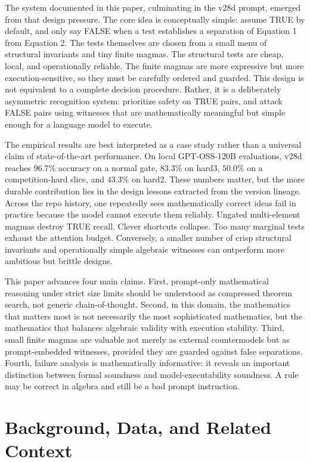 \documentclass[12pt]{amsart}
\begin{document}
The system documented in this paper, culminating in the v28d prompt, emerged from that design pressure. The core idea is conceptually simple: assume TRUE by default, and only say FALSE when a test establishes a separation of Equation 1 from Equation 2. The tests themselves are chosen from a small menu of structural invariants and tiny finite magmas. The structural tests are cheap, local, and operationally reliable. The finite magmas are more expressive but more execution-sensitive, so they must be carefully ordered and guarded. This design is not equivalent to a complete decision procedure. Rather, it is a deliberately asymmetric recognition system: prioritize safety on TRUE pairs, and attack FALSE pairs using witnesses that are mathematically meaningful but simple enough for a language model to execute.

The empirical results are best interpreted as a case study rather than a universal claim of state-of-the-art performance. On local GPT-OSS-120B evaluations, v28d reaches $96.7\%$ accuracy on a normal gate, $83.3\%$ on hard3, $50.0\%$ on a competition-hard slice, and $43.3\%$ on hard2. These numbers matter, but the more durable contribution lies in the design lessons extracted from the version lineage. Across the repo history, one repeatedly sees mathematically correct ideas fail in practice because the model cannot execute them reliably. Ungated multi-element magmas destroy TRUE recall. Clever shortcuts collapse. Too many marginal tests exhaust the attention budget. Conversely, a smaller number of crisp structural invariants and operationally simple algebraic witnesses can outperform more ambitious but brittle designs.

This paper advances four main claims. First, prompt-only mathematical reasoning under strict size limits should be understood as compressed theorem search, not generic chain-of-thought. Second, in this domain, the mathematics that matters most is not necessarily the most sophisticated mathematics, but the mathematics that balances algebraic validity with execution stability. Third, small finite magmas are valuable not merely as external countermodels but as prompt-embedded witnesses, provided they are guarded against false separations. Fourth, failure analysis is mathematically informative: it reveals an important distinction between formal soundness and model-executability soundness. A rule may be correct in algebra and still be a bad prompt instruction.

\section{Background, Data, and Related Context}
\end{document}
